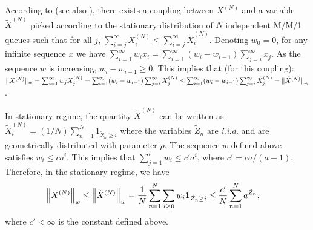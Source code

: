 \documentclass[sigconf]{acmart}
\newcommand\XN{X^{(N)}}
\newcommand\XtN{\tilde{X}^{(N)}}
\newcommand\sProba[1]{\mathbf{P}[#1]}
\newcommand\norm[1]{{\mathchoice{\bnorm{#1}}{\snorm{#1}}{\snorm{#1}}{\snorm{#1}}}}
\newcommand\bnorm[1]{\left\|#1\right\|}
\newcommand\snorm[1]{\|#1\|}
\begin{document}

According to \cite[Theorem~4]{turner1998effect} (see also
\cite[Theorem~4.1]{graham2000chaoticity}), there exists a coupling
between $\XN$ and a variable $\XtN$ picked according to the
stationary distribution of $N$ independent M/M/1 queues such that for
all $j$, $\sum_{i=j}^\infty\XN_i\le\sum_{i=j}^\infty\XtN_i$. Denoting
$w_0=0$, for any infinite sequence $x$ we have
$\sum_{i=1}^\infty
w_ix_i=\sum_{i=1}^\infty(w_{i}-w_{i-1})\sum_{j=i}^\infty x_j$.
As the sequence $w$ is increasing, $w_i-w_{i-1}\ge0$. This implies
that (for this coupling): 
$\snorm{\XN}_w=\sum_{i=1}^\infty
w_j\XN_j=\sum_{i=1}^\infty(w_{i}-w_{i-1})\sum_{j=i}^\infty\XN_j \le
\sum_{i=1}^\infty(w_i-w_{i-1})\sum_{j=i}^\infty\XtN_j =\norm{\XtN}_w
$.

In stationary regime, the quantity $\XtN$ can be written as
$\XtN_i=(1/N)\sum_{n=1}^N1_{\tilde{Z}_n\ge i}$ where the variables
$\tilde{Z}_n$ are \emph{i.i.d.} and are geometrically distributed with
parameter $\rho$. The sequence $w$ defined above satisfies
$w_i\le c a^i$. This implies that $\sum_{j=1}^i w_i\le c' a^i$, where
$c'=ca/(a-1)$.  Therefore, in the stationary regime, we have
\begin{align*}
  \norm{\XN}_w\le\norm{\XtN}_w&=\frac{1}{N}\sum_{n=1}^N\sum_{i\ge0} w_i
                                      \mathbf{1}_{\tilde{Z}_n\ge i} 
  \le \frac{c'}{N}\sum_{n=1}^Na^{\tilde{Z}_n},
\end{align*}
where $c'<\infty$ is the constant defined above.
\end{document}
